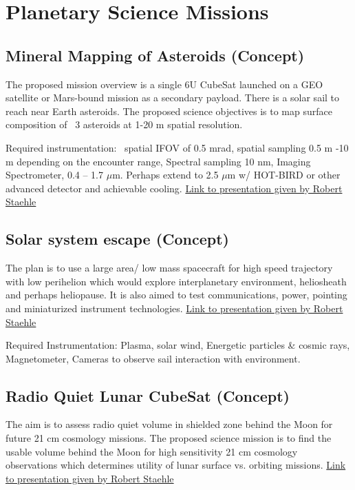 \section{Planetary Science Missions}

\subsection{Mineral Mapping of Asteroids (Concept)}
The proposed mission overview is a single 6U CubeSat launched on a GEO satellite 
or Mars-bound mission as a secondary payload. There is a solar sail to reach near Earth asteroids. The proposed science objectives is to map surface composition of ~3 asteroids at 1-20 m spatial resolution.

Required instrumentation: ~spatial IFOV of 0.5 mrad, spatial sampling 0.5 m -10 m depending on the encounter range, Spectral sampling 10 nm, Imaging Spectrometer, 0.4 – 1.7 $\mu$m. Perhaps extend to 2.5 $\mu$m w/ HOT-BIRD or other advanced detector and achievable cooling. \href{http://kiss.caltech.edu/cosponsored/cubesat2012/presentations/staehle-interplanetary-cubesat-missions.pdf}{Link to presentation given by Robert Staehle}

\subsection{Solar system escape (Concept)}
The plan is to use a large area/ low mass spacecraft for high speed trajectory with low perihelion which would explore interplanetary environment, heliosheath and perhaps heliopause. It is also aimed to test communications, power, pointing and miniaturized instrument technologies.  \href{http://kiss.caltech.edu/cosponsored/cubesat2012/presentations/staehle-interplanetary-cubesat-missions.pdf}{Link to presentation given by Robert Staehle}

Required Instrumentation: Plasma, solar wind, Energetic particles \& cosmic rays, Magnetometer, Cameras to observe sail interaction with environment.


\subsection{Radio Quiet Lunar CubeSat (Concept)}
The aim is to assess radio quiet volume in shielded zone behind the Moon for future 21 cm cosmology missions. The proposed science mission is to find the usable volume behind the Moon for high sensitivity 21 cm cosmology observations which determines utility of lunar surface vs. orbiting missions.  \href{http://kiss.caltech.edu/cosponsored/cubesat2012/presentations/staehle-interplanetary-cubesat-missions.pdf}{Link to presentation given by Robert Staehle}

